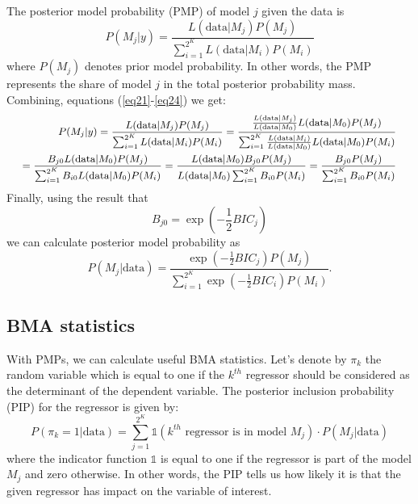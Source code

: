 \documentclass[a4paper]{article}
\begin{document}
The posterior model probability (PMP) of model $j$ given the data is
\begin{equation}\label{eq24}
    P(M_{j}|y)=\frac{L(\text{data}|M_{j})P(M_{j})}{\sum_{i=1}^{2^K}L(\text{data}|M_{i})P(M_{i})}
\end{equation}
where $P(M_{j})$ denotes prior model probability.
In other words, the PMP represents the share of model $j$ in the total posterior probability mass.
Combining, equations (\ref{eq21}-\ref{eq24}) we get:
\begin{equation}\label{eq25}
\fontsize{9pt}{12pt} \selectfont
\begin{split}
    P(M_{j}|y)=\frac{L(\text{data}|M_{j})P(M_{j})}{\sum_{i=1}^{2^K}L(\text{data}|M_{i})P(M_{i})}
    =\frac{\frac{L(\text{data}|M_{j})}{L(\text{data}|M_{0})}
    L(\text{data}|M_{0})P(M_{j})}{\sum_{i=1}^{2^K}\frac{L(\text{data}|M_{i})}{L(\text{data}|M_{0})}
    L(\text{data}|M_{0})P(M_{i})}\\
    =\frac{B_{j0}L(\text{data}|M_{0})P(M_{j})}{\sum_{i=1}^{2^K}B_{i0}
    L(\text{data}|M_{0})P(M_{i})}
    =\frac{L(\text{data}|M_{0})B_{j0}P(M_{j})}{L(\text{data}|M_{0})\sum_{i=1}^{2^K}B_{i0}P(M_{i})}
    =\frac{B_{j0}P(M_{j})}{\sum_{i=1}^{2^K}B_{i0}P(M_{i})}
\end{split}
\end{equation}
\normalsize
Finally, using the result that
\begin{equation}\label{eq26}
 B_{j0}=\exp{(-\frac{1}{2}BIC_{j})}
\end{equation}
we can calculate posterior model probability as
\begin{equation}\label{eq27}
    P(M_{j}|\text{data})=\frac{\exp{(-\frac{1}{2}BIC_{j})}P(M_{j})}{\sum_{i=1}^{2^K}\exp{(-\frac{1}{2}BIC_{i})} P(M_{i})}.
\end{equation}

\subsection{BMA statistics}
\noindent With PMPs, we can calculate useful BMA statistics.
Let's denote by $\pi_k$ the random variable which is equal to one if the $k^{th}$ regressor should be considered as the determinant of the dependent variable.
The posterior inclusion probability (PIP) for the regressor is given by:
\begin{equation}
P(\pi_k = 1 |\text{data}) = \sum_{j=1}^{2^K} \mathds{1} (k^{th} \text{ regressor is in model } M_{j}) \cdot P(M_{j}|\text{data})
\end{equation}
where the indicator function $\mathds{1}$ is equal to one if the regressor is part of the model $M_j$ and zero otherwise.
In other words, the PIP tells us how likely it is that the given regressor has impact on the variable of interest.
\end{document}
